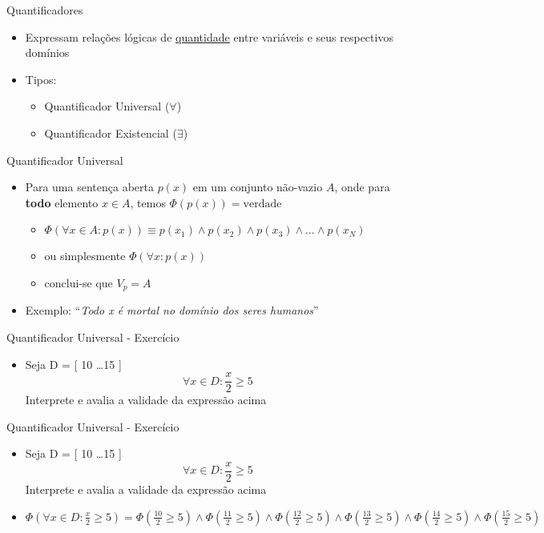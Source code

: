 \begin{frame}[t]{Quantificadores}
	\begin{itemize} \itemsep 0.8cm
	\item Expressam relações lógicas de \underline{quantidade} entre variáveis e seus respectivos domínios
	\item Tipos:
	\begin{itemize}
	\item Quantificador Universal ($\forall$)
	\item Quantificador Existencial ($\exists$)
	\end{itemize}
	\end{itemize}
\end{frame}

\begin{frame}[t]{Quantificador Universal}
	\begin{itemize} \itemsep 0.8cm
	\item Para uma sentença aberta $p(x)$ em um conjunto não-vazio $A$, onde para {\bf todo} elemento $x \in A$, temos $\Phi(p(x)) = \mbox{verdade}$
	\begin{itemize}
	\item $\Phi(\forall x \in A: p(x)) \equiv p(x_1) \wedge p(x_2) \wedge p(x_3) \wedge \ldots \wedge p(x_N)$
	\item ou simplesmente $\Phi(\forall x: p(x))$
	\item conclui-se que $V_p = A$
	\end{itemize}

	\item Exemplo: ``{\it Todo x é mortal no domínio dos seres humanos}''
	\end{itemize}
\end{frame}

\begin{frame}[t]{Quantificador Universal - Exercício}
	\begin{itemize}
	\item Seja D = [ 10 \ldots 15 ] $$\forall x \in D: \frac{x}{2} \geq 5$$ Interprete e avalia a validade da expressão acima
	\end{itemize}
\end{frame}

\begin{frame}[t]{Quantificador Universal - Exercício}
	\begin{itemize} \itemsep 0.7cm
	\item Seja D = [ 10 \ldots 15 ] $$\forall x \in D: \frac{x}{2} \geq 5$$ Interprete e avalia a validade da expressão acima

	\item {\scriptsize $\Phi(\forall x \in D: \frac{x}{2} \geq 5) = \Phi(\frac{10}{2} \geq 5) \wedge \Phi(\frac{11}{2} \geq 5) \wedge \Phi(\frac{12}{2} \geq 5) \wedge \Phi(\frac{13}{2} \geq 5) \wedge \Phi(\frac{14}{2} \geq 5) \wedge \Phi(\frac{15}{2} \geq 5)$}
	\end{itemize}
\end{frame}


